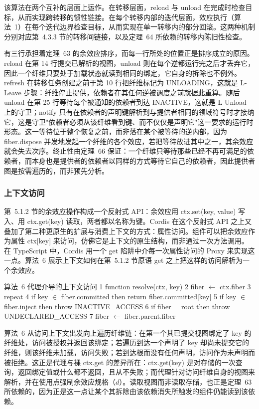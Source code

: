 \documentclass[
  10
]{article}
\begin{document}
该算法在两个互补的层面上运作。在转移层面，reload 与 unload 在完成时检查目标，从而实现跨转移的惯性链接。在每个转移内部的迭代层面，效应执行（算法~1）在每个迭代边界检查目标，从而实现在单一转移内的部分回滚。这两种机制分别对应第~4.3.3 节的转移间链接，以及定理~64 所依赖的转移内陈旧性检查。

有三行承担着定理~63 的余效应排序，而每一行所处的位置正是排序成立的原因。reload 在第 14 行提交已解析的视图，unload 则在每个逆都运行完之后才丢弃它，因此一个纤维只要处于加载状态就读到相同的绑定，它自身的拆除也不例外。refresh 在转移任务创建之前于第 10 行把纤维标记为 UNLOADING，这就是 L-Leave 步骤：纤维停止提供，依赖者在其任何逆被调度之前就据此重算。随后 unload 在第 25 行等待每个被通知的依赖者到达 INACTIVE，这就是 L-Unload 上的守卫；notify 只有在依赖者的声明键解析到与提供者相同的领域符号时才接纳它，这是守卫"依赖者必须从该纤维看到键、而不仅仅是声明它"这一要求的运行时形态。这一等待位于整个恢复之前，而非落在某个被等待的逆内部，因为 fiber.dispose 并发地发起一个纤维的各个效应，若把等待放进其中之一，其余效应就会失去次序。终止性由定理~66 保证：一个纤维只等待那些已经不再可满足的依赖者，而本身也是提供者的依赖者以同样的方式等待它自己的依赖者，因此提供者图是按需遍历的，而非预先分析。

\subsubsection{上下文访问} \label{context-access}

第~5.1.2 节的余效应操作构成一个反射式 API：余效应用 ctx.set(key, value) 写入、用 ctx.get(key) 读取，两者都以名称为键。Cordis 在这个反射式 API 之上又叠加了第二种更原生的扩展与消费上下文的方式：属性访问。组件可以把余效应作为属性 ctx{[}key{]} 来访问，仿佛它是上下文的原生结构，而非通过一次方法调用。在 TypeScript 中，Cordis 用一个 get 陷阱中介每一次属性访问的 Proxy 来实现这一点。算法~6 展示上下文如何在第~5.1.2 节原语 get 之上把这样的访问解析为一个余效应。

算法~6 代理介导的上下文访问
1 function resolve(ctx, key)
2 fiber $\leftarrow$ ctx.fiber
3 repeat
4 if key $\in$ fiber.committed then return fiber.committed{[}key{]}
5 if key $\in$ fiber.inject then throw INACTIVE\_ACCESS
6 if fiber = root then throw UNDECLARED\_ACCESS
7 fiber $\leftarrow$ fiber.parent.fiber

算法~6 从访问上下文出发向上遍历纤维链：在第一个其已提交视图绑定了 key 的纤维处，访问被授权并返回该绑定；若遍历到达一个声明了 key 却尚未提交它的纤维，则该纤维未加载，访问失败；若到达根而没有任何声明，访问作为未声明而被拒绝。这正是代理与裸 ctx.get 的差异所在：ctx.get(key) 是对存储的一次查询，返回绑定值或什么都不返回，且从不失败；而代理针对访问纤维自身的视图来解析，并在使用点强制余效应规格（\(d\)）。读取视图而非读取存储，也正是定理~63 所依赖的，因为正是这一点让某个其拆除由该依赖消失所触发的组件仍能读到该依赖。
\end{document}
